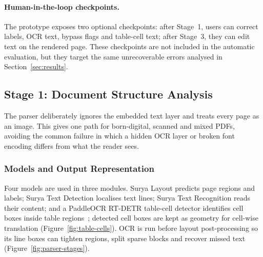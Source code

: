 \paragraph{Human-in-the-loop checkpoints.} The prototype exposes two optional
checkpoints: after Stage~1, users can correct labels, OCR text, bypass flags and
table-cell text; after Stage~3, they can edit text on the rendered page. These
checkpoints are not included in the automatic evaluation, but they target the
same unrecoverable errors analysed in Section~\ref{sec:results}.

\subsection{Stage 1: Document Structure Analysis}
\label{subsec:method-parser}

The parser deliberately ignores the embedded text layer and treats every page as
an image. This gives one path for born-digital, scanned and mixed PDFs, avoiding
the common failure in which a hidden OCR layer or broken font encoding differs
from what the reader sees.

\subsubsection{Models and Output Representation}

Four models are used in three modules. Surya Layout predicts page regions and
labels; Surya Text Detection localises text lines; Surya Text Recognition reads
their content; and a PaddleOCR RT-DETR table-cell detector identifies cell boxes
inside table regions~\citep{surya,paddleocr}; detected cell boxes are kept as
geometry for cell-wise translation (Figure~\ref{fig:table-cells}). OCR is run before layout
post-processing so its line boxes can tighten regions, split sparse blocks and
recover missed text (Figure~\ref{fig:parser-stages}).

